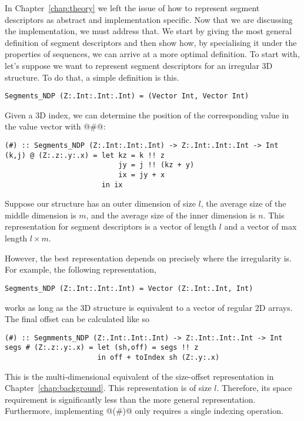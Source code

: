 In Chapter~\ref{chap:theory} we left the issue of how to represent segment descriptors as abstract and implementation specific. Now that we are discussing the implementation, we must address that. We start by giving the most general definition of segment descriptors and then show how, by specialising it under the properties of sequences, we can arrive at a more optimal definition. To start with, let's suppose we want to represent segment descriptors for an irregular 3D structure. To do that, a simple definition is this.
%
\begin{lstlisting}[style=ndp]
Segments_NDP (Z:.Int:.Int:.Int) = (Vector Int, Vector Int)
\end{lstlisting}
%
Given a 3D index, we can determine the position of the corresponding value in the value vector with @#@:
%
\begin{lstlisting}[style=ndp]
(#) :: Segments_NDP (Z:.Int:.Int:.Int) -> Z:.Int:.Int:.Int -> Int
(k,j) @ (Z:.z:.y:.x) = let kz = k !! z
                           jy = j !! (kz + y)
                           ix = jy + x
                       in ix
\end{lstlisting}
%

Suppose our structure has an outer dimension of size $l$, the average size of the middle dimension is $m$, and the average size of the inner dimension is $n$. This representation for segment descriptors is a vector of length $l$ and a vector of max length $l \times m$.

However, the best representation depends on precisely where the irregularity is. For example, the following representation,
%
\begin{lstlisting}[style=ndp]
Segments_NDP (Z:.Int:.Int:.Int) = Vector (Z:.Int:.Int, Int)
\end{lstlisting}
%
works as long as the 3D structure is equivalent to a vector of regular 2D arrays. The final offset can be calculated like so
%
\begin{lstlisting}[style=ndp]
(#) :: Segmments_NDP (Z:.Int:.Int:.Int) -> Z:.Int:.Int:.Int -> Int
segs # (Z:.z:.y:.x) = let (sh,off) = segs !! z
                      in off + toIndex sh (Z:.y:.x)
\end{lstlisting}
%
This is the multi-dimensional equivalent of the size-offset representation in Chapter~\ref{chap:background}. This representation is of size $l$. Therefore, its space requirement is significantly less than the more general representation. Furthermore, implementing @(#)@ only requires a single indexing operation.

